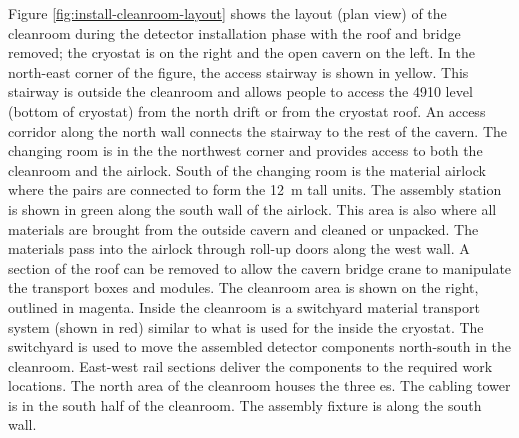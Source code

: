 Figure \ref{fig:install-cleanroom-layout} shows the layout (plan view) of the cleanroom during the detector installation phase with the roof and bridge removed; the cryostat is on the right and the open cavern on the left. In the north-east corner of the figure, the access stairway is shown in yellow. This stairway is outside the cleanroom and allows people to access the 4910 level (bottom of cryostat) from the north drift or from the cryostat roof. An access corridor along the north wall connects the stairway to the rest of the cavern.  The changing room is in the the northwest corner and provides access to both the cleanroom and the airlock.
%
 South of the changing room is the material airlock where the  pairs are connected   to form the \SI{12}{m} tall units. The   assembly station is shown in green along the south wall of the airlock. This area is also where all materials are brought from the outside cavern and cleaned or unpacked. The materials pass  into the airlock through roll-up doors along the west wall. A section of the roof can be removed to allow the cavern bridge crane to manipulate the  transport boxes and modules.  
The cleanroom area is shown on the right, outlined in magenta. Inside the cleanroom is a switchyard material transport system (shown in red) similar to what is used for the  inside the cryostat. The switchyard is used to move the assembled detector components north-south in the cleanroom. East-west rail sections deliver the components to the required work locations. The north area of the cleanroom houses the three \coldbox{}es. The  cabling tower is in the south half of the cleanroom.  The  assembly fixture is along the south wall.  
 
